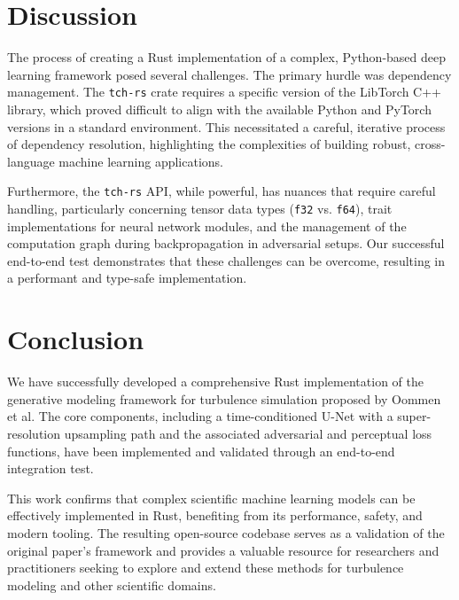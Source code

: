 \documentclass{article}
\begin{document}
\section{Discussion}
The process of creating a Rust implementation of a complex, Python-based deep learning framework posed several challenges. The primary hurdle was dependency management. The \texttt{tch-rs} crate requires a specific version of the LibTorch C++ library, which proved difficult to align with the available Python and PyTorch versions in a standard environment. This necessitated a careful, iterative process of dependency resolution, highlighting the complexities of building robust, cross-language machine learning applications.

Furthermore, the \texttt{tch-rs} API, while powerful, has nuances that require careful handling, particularly concerning tensor data types (\texttt{f32} vs. \texttt{f64}), trait implementations for neural network modules, and the management of the computation graph during backpropagation in adversarial setups. Our successful end-to-end test demonstrates that these challenges can be overcome, resulting in a performant and type-safe implementation.

\section{Conclusion}
We have successfully developed a comprehensive Rust implementation of the generative modeling framework for turbulence simulation proposed by Oommen et al. The core components, including a time-conditioned U-Net with a super-resolution upsampling path and the associated adversarial and perceptual loss functions, have been implemented and validated through an end-to-end integration test.

This work confirms that complex scientific machine learning models can be effectively implemented in Rust, benefiting from its performance, safety, and modern tooling. The resulting open-source codebase serves as a validation of the original paper's framework and provides a valuable resource for researchers and practitioners seeking to explore and extend these methods for turbulence modeling and other scientific domains.



\end{document}
